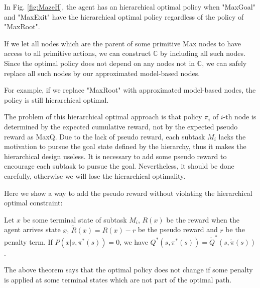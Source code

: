
In Fig. \ref{fig:MazeH}, the agent has an hierarchical optimal policy when "MaxGoal" and "MaxExit"
have the hierarchical optimal policy regardless of the policy of "MaxRoot".

If we let all nodes which are the parent of some primitive Max nodes to have access
to all primitive actions, we can construct $\mathbb{C}$ by including all 
such nodes. Since the optimal policy does not depend on any nodes not in $\mathbb{C}$, 
we can safely replace all such nodes by our approximated model-based nodes.

For example, if we replace "MaxRoot" with approximated model-based nodes,
the policy is still hierarchical optimal. 

The problem of this hierarchical optimal approach is that policy $\pi_i$ of $i$-th
node is determined by the expected cumulative reward, not by the expected pseudo reward as
MaxQ. Due to the lack of pseudo reward, each subtask $M_i$ lacks the motivation to 
pursue the goal state defined by the hierarchy, thus it makes the hierarchical 
design useless. 
It is necessary to add some pseudo reward to encourage each subtask to pursue 
the goal. Nevertheless, it should be done carefully, otherwise we will lose
the hierarchical optimality.

Here we show a way to add the pseudo reward without violating the hierarchical 
optimal constraint:
\begin{theorem}
    Let $x$ be some terminal state of subtask $M_i$, $R(x)$ be the reward
    when the agent arrives state $x$, $\tilde{R}(x) = R(x) - r$ be the pseudo reward
    and $r$ be the penalty term.
    If $P(x| s, \pi^*(s)) = 0$, we have $Q^*(s, \pi^*(s)) = \tilde{Q}^*(s, \tilde{\pi}(s))$.
\end{theorem}

The above theorem says that the optimal policy does not change 
if some penalty is applied at some terminal states which are not part of the optimal path.

